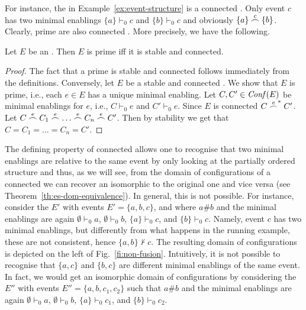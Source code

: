 For instance, the {\esabbr} in
Example~\ref{ex:event-structure} is a connected {\esabbr}. Only event $c$ has
two minimal enablings $\{ a \} \vdash_0 c$ and $\{ b \} \vdash_0 c$
and obviously $\{ a \} \stackrel{c}{\frown} \{ b \}$.
%
Clearly, prime {\esabbr} are also connected {\esabbr}. More precisely, we have the following.

\begin{proposition}[{primality = stability + connectedness}]
  \label{le:constapri}
  Let ${E}$ be an {\esabbr}. Then $E$ is prime iff it is stable and connected.
\end{proposition}

\begin{proof}
  The fact that a prime {\esabbr} is stable and connected follows immediately
  from the definitions. Conversely, let ${E}$ be a stable and
  connected {\esabbr}. We show that $E$ is prime, i.e., each $e \in E$ has a
  unique minimal enabling. Let $C, C' \in \mathit{Conf}({E})$ be minimal
  enablings for $e$, i.e., $C \vdash_0 e$ and $C' \vdash_0 e$. Since
  $E$ is connected $C \stackrel{e}{\frown}^* C'$. Let
  $C \stackrel{e}{\frown} C_1 \stackrel{e}{\frown} \ldots \stackrel{e}{\frown} C_n \stackrel{e}{\frown} C'$. Then
  by stability we get that $C=C_1=\ldots = C_n =C'$. 
\end{proof}


The defining property of connected {\esabbr} allows one to recognise that two
minimal enablings are relative to the same event by only looking at
the partially ordered structure and thus, as we will see, from the
domain of configurations of a connected {\esabbr} we can recover an {\esabbr}
isomorphic to the original one and vice versa (see Theorem~\ref{th:es-dom-equivalence}). 
In general, this is not possible.
%
For instance, consider the {\esabbr} ${E}'$ with events
$E' = \{ a, b, c \}$, and where $a \# b$ and the minimal enablings are
again $\emptyset \vdash_0 a$, $\emptyset \vdash_0 b$,
$\{ a\} \vdash_0 c$, and $\{ b\} \vdash_0 c$. Namely, event $c$ has two
minimal enablings, but differently from what happens in the
running example, these are not consistent, hence
$ \{ a, b \} \not\vdash c$. The resulting domain of configurations is depicted on
the left of Fig.~\ref{fi:non-fusion}. Intuitively, it is not possible
to recognise that $\{ a,c\}$ and $\{ b, c \}$ are different minimal enablings
of the same event. In fact, we would get an isomorphic
domain of configurations by considering the {\esabbr} ${E}''$ with events
$E'' = \{ a, b, c_1, c_2 \}$ such that $a \# b$ and the minimal enablings
are again $\emptyset \vdash_0 a$, $\emptyset \vdash_0 b$,
$\{ a\} \vdash_0 c_1$, and $\{ b\} \vdash_0 c_2$.

